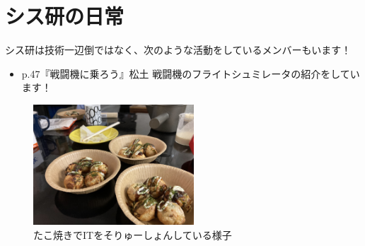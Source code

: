 \chapter{シス研の日常}

シス研は技術一辺倒ではなく、次のような活動をしているメンバーもいます！

\begin{tcolorbox}[title=お品書き]
  \begin{itemize}
    \item p.47『戦闘機に乗ろう』松土
          戦闘機のフライトシュミレータの紹介をしています！
  \end{itemize} 
\end{tcolorbox}

\begin{figure}[H]
  \centering
  \includegraphics[width=6cm]{./image/04-Intarasting/takoyaki_soryusyon.jpg}
  \caption{たこ焼きでITをそりゅーしょんしている様子}
  \label{takoyaki_soryusyon}
\end{figure}
